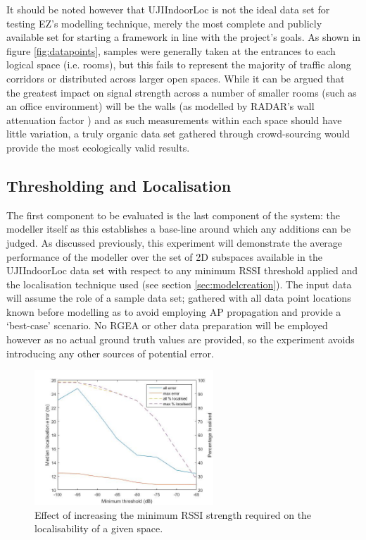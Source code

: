 \documentclass{UoYCSproject}
\begin{document}
            It should be noted however that UJIIndoorLoc is not the ideal data set for testing EZ's modelling technique, merely the most complete and publicly available set for starting a framework in line with the project's goals. As shown in figure \ref{fig:datapoints}, samples were generally taken at the entrances to each logical space (i.e. rooms), but this fails to represent the majority of traffic along corridors or distributed across larger open spaces. While it can be argued that the greatest impact on signal strength across a number of smaller rooms (such as an office environment) will be the walls (as modelled by RADAR's wall attenuation factor \citep{bahl2000radar}) and as such measurements within each space should have little variation, a truly organic data set gathered through crowd-sourcing would provide the most ecologically valid results.
            
            \subsection{Thresholding and Localisation}
            
	            The first component to be evaluated is the last component of the system: the modeller itself as this establishes a base-line around which any additions can be judged. As discussed previously, this experiment will demonstrate the average performance of the modeller over the set of 2D subspaces available in the UJIIndoorLoc data set with respect to any minimum RSSI threshold applied and the localisation technique used (see section \ref{sec:modelcreation}). The input data will assume the role of a sample data set; gathered with all data point locations known before modelling as to avoid employing AP propagation and provide a `best-case' scenario. No RGEA or other data preparation will be employed however as no actual ground truth values are provided, so the experiment avoids introducing any other sources of potential error.
            
                \begin{figure}[h]
                    \label{fig:threshold}
                    \centering
                    \includegraphics[width=0.6\textwidth]{threshold.jpg}
                    \caption{Effect of increasing the minimum RSSI strength required on the localisability of a given space.}
                \end{figure}
                
\end{document}
